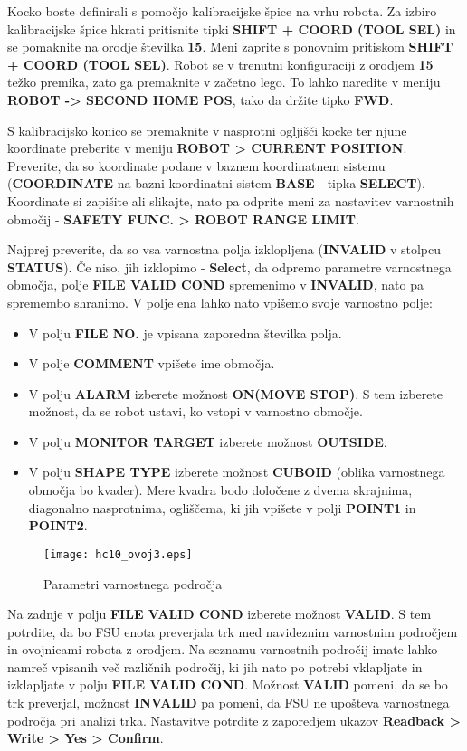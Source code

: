 Kocko boste definirali s pomočjo kalibracijske špice na vrhu robota. Za izbiro kalibracijske špice hkrati pritisnite tipki \textbf{SHIFT + COORD (TOOL SEL)} in se pomaknite na orodje številka \textbf{15}. Meni zaprite s ponovnim pritiskom \textbf{SHIFT + COORD (TOOL SEL)}. Robot se v trenutni konfiguraciji z orodjem \textbf{15} težko premika, zato ga premaknite v začetno lego. To lahko naredite v meniju \textbf{ROBOT -> SECOND HOME POS}, tako da držite tipko \textbf{FWD}.

S kalibracijsko konico se premaknite v nasprotni ogljišči kocke ter njune koordinate preberite v meniju \textbf{ROBOT > CURRENT POSITION}. Preverite, da so koordinate podane v baznem koordinatnem sistemu (\textbf{COORDINATE} na bazni koordinatni sistem \textbf{BASE} - tipka \textbf{SELECT}). Koordinate si zapišite ali slikajte, nato pa odprite meni za nastavitev varnostnih območij - \textbf{SAFETY FUNC. > ROBOT RANGE LIMIT}.

Najprej preverite, da so vsa varnostna polja izklopljena (\textbf{INVALID} v stolpcu \textbf{STATUS}). Če niso, jih izklopimo - \textbf{Select}, da odpremo parametre varnostnega območja, polje \textbf{FILE VALID COND}  spremenimo v \textbf{INVALID}, nato pa spremembo shranimo. V polje ena lahko nato vpišemo svoje varnostno polje:

\begin{itemize}
	\item V polju \textbf{FILE NO.} je vpisana zaporedna številka polja.
	\item V polje \textbf{COMMENT} vpišete ime območja.
	\item V polju \textbf{ALARM} izberete možnost \textbf{ON(MOVE STOP)}. S tem izberete možnost, da se robot ustavi, ko vstopi v varnostno območje.
	\item V polju \textbf{MONITOR TARGET} izberete možnost \textbf{OUTSIDE}.
	\item V polju \textbf{SHAPE TYPE} izberete možnost \textbf{CUBOID} (oblika varnostnega območja bo kvader). Mere kvadra bodo določene z dvema skrajnima, diagonalno nasprotnima,  ogliščema, ki jih vpišete v polji  \textbf{POINT1} in \textbf{POINT2}.
\end{itemize}

\begin{figure}[!hbt]
	\centering
	\texttt{[image: hc10\_ovoj3.eps]}
	\caption{Parametri varnostnega področja}
	\label{fig:hc10_ovoj3}
\end{figure}

Na zadnje v polju \textbf{FILE VALID COND} izberete možnost \textbf{VALID}. S tem potrdite, da bo FSU enota preverjala trk med navideznim varnostnim področjem in ovojnicami robota z orodjem. Na seznamu varnostnih področij imate lahko namreč vpisanih več različnih področij, ki jih nato po potrebi vklapljate in izklapljate  v polju \textbf{FILE VALID COND}. Možnost \textbf{VALID} pomeni, da se bo trk preverjal, možnost \textbf{INVALID} pa pomeni, da FSU ne upošteva varnostnega področja pri analizi trka. Nastavitve potrdite z zaporedjem ukazov \textbf{Readback > Write > Yes > Confirm}.

